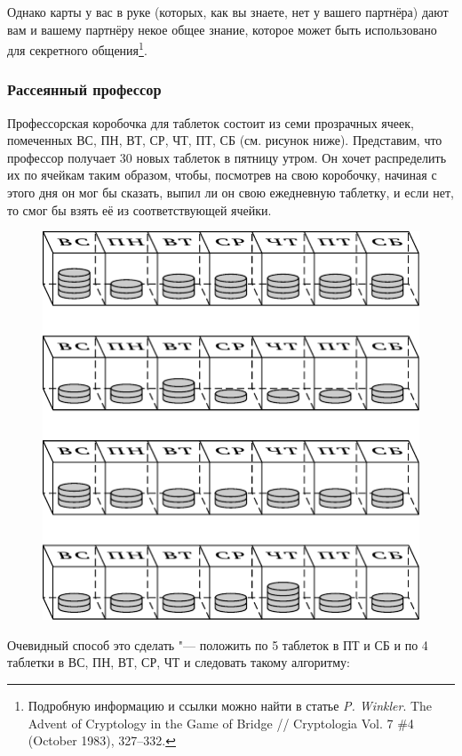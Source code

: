 \documentclass[twoside]{book}
\begin{document}
Однако карты у вас в руке (которых, как вы знаете, нет у вашего партнёра) дают вам и вашему партнёру некое общее знание, которое может быть использовано для секретного общения\footnote{
Подробную информацию и ссылки можно найти в статье \emph{P. Winkler}. The Advent of Cryptology in the Game of Bridge /\!/ {Cryptologia} Vol. 7 \#4 (October 1983),  327--332.}.

\subsubsection*{Рассеянный профессор}%

Профессорская коробочка для таблеток состоит из семи прозрачных ячеек, помеченных ВС, ПН, ВТ, СР, ЧТ, ПТ, СБ (см. рисунок ниже).
Представим, что профессор получает 30 новых таблеток в пятницу утром.
Он хочет распределить их по ячейкам таким образом, чтобы, посмотрев на свою коробочку, начиная с этого дня он мог бы сказать, выпил ли он свою ежедневную таблетку, и если нет, то смог бы взять её из соответствующей ячейки.

\begin{figure}[!ht]
\centering
\includegraphics{mp/wink-25}
\end{figure}


Очевидный способ это сделать "--- положить по 5 таблеток в ПТ и СБ и по 4 таблетки в ВС, ПН, ВТ, СР, ЧТ и следовать такому алгоритму:
\end{document}
